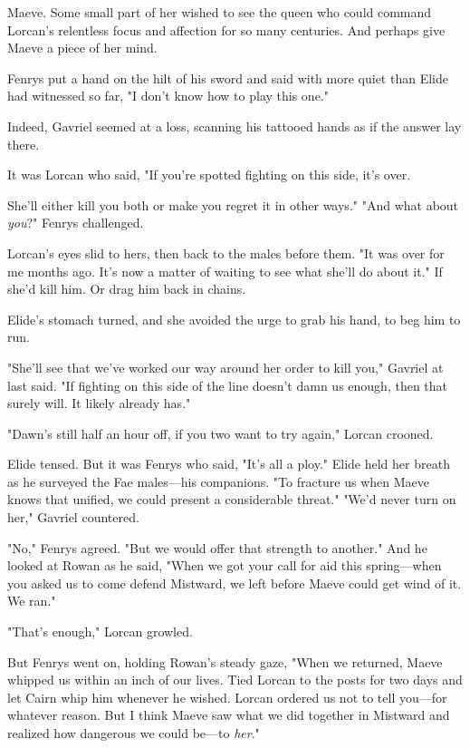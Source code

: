 Maeve.
Some small part of her wished to see the queen who could command Lorcan's relentless focus and affection for so many centuries.
And perhaps give Maeve a piece of her mind.

Fenrys put a hand on the hilt of his sword and said with more quiet than Elide had witnessed so far, "I don't know how to play this one."

Indeed, Gavriel seemed at a loss, scanning his tattooed hands as if the answer lay there.

It was Lorcan who said, "If you're spotted fighting on this side, it's over.

She'll either kill you both or make you regret it in other ways."
"And what about \emph{you}?"
Fenrys challenged.

Lorcan's eyes slid to hers, then back to the males before them.
"It was over for me months ago.
It's now a matter of waiting to see what she'll do about it."
If she'd kill him.
Or drag him back in chains.

Elide's stomach turned, and she avoided the urge to grab his hand, to beg him to run.

"She'll see that we've worked our way around her order to kill you," Gavriel at last said.
"If fighting on this side of the line doesn't damn us enough, then that surely will.
It likely already has."

"Dawn's still half an hour off, if you two want to try again," Lorcan crooned.

Elide tensed.
But it was Fenrys who said, "It's all a ploy."
Elide held her breath as he surveyed the Fae males---his companions.
"To fracture us when Maeve knows that unified, we could present a considerable threat."
"We'd never turn on her," Gavriel countered.

"No," Fenrys agreed.
"But we would offer that strength to another."
And he looked at Rowan as he said, "When we got your call for aid this spring---when you asked us to come defend Mistward, we left before Maeve could get wind of it.
We ran."

"That's enough," Lorcan growled.

But Fenrys went on, holding Rowan's steady gaze, "When we returned, Maeve whipped us within an inch of our lives.
Tied Lorcan to the posts for two days and let Cairn whip him whenever he wished.
Lorcan ordered us not to tell you---for whatever reason.
But I think Maeve saw what we did together in Mistward and realized how dangerous we could be---to \emph{her}."

